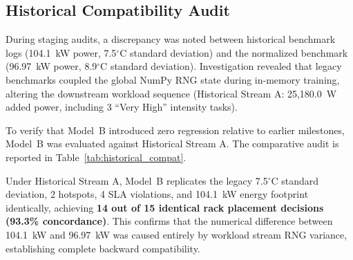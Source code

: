 \documentclass[conference,10pt]{IEEEtran}
\begin{document}
\subsection{Historical Compatibility Audit}
During staging audits, a discrepancy was noted between historical benchmark logs (104.1~kW power, 7.5$^\circ$C standard deviation) and the normalized benchmark (96.97~kW power, 8.9$^\circ$C standard deviation). Investigation revealed that legacy benchmarks coupled the global NumPy RNG state during in-memory training, altering the downstream workload sequence (Historical Stream A: 25,180.0~W added power, including 3 ``Very High'' intensity tasks).

To verify that Model~B introduced zero regression relative to earlier milestones, Model~B was evaluated against Historical Stream A. The comparative audit is reported in Table~\ref{tab:historical_compat}.

\begin{table}[htbp]
\caption{Historical Stream A Compatibility Audit (Zero Regression Proof)}
\label{tab:historical_compat}
\centering
{}
\end{table}

Under Historical Stream A, Model~B replicates the legacy 7.5$^\circ$C standard deviation, 2 hotspots, 4 SLA violations, and 104.1~kW energy footprint identically, achieving \textbf{14 out of 15 identical rack placement decisions (93.3\% concordance)}. This confirms that the numerical difference between 104.1~kW and 96.97~kW was caused entirely by workload stream RNG variance, establishing complete backward compatibility.
\end{document}
